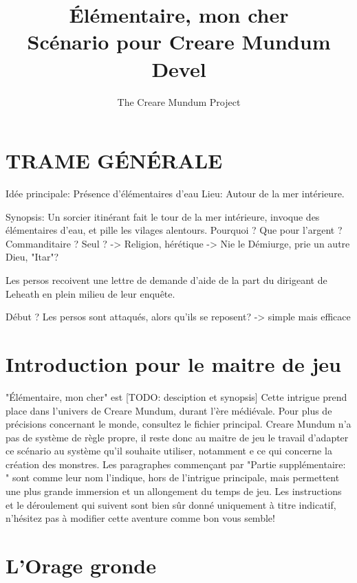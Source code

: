 \documentclass[a4paper]{article}
\title{Élémentaire, mon cher\\ Scénario pour Creare Mundum \\ Devel}
\author{The Creare Mundum Project}
\date{\oldstylenums{\insertdate}}
\begin{document}
\maketitle
\setcounter{tocdepth}{1} %
\renewcommand{\contentsname}{Sommaire} 
\tableofcontents
\newpage

\section*{TRAME GÉNÉRALE}
Idée principale: Présence d'élémentaires d'eau
Lieu: Autour de la mer intérieure.

Synopsis: Un sorcier itinérant fait le tour de la mer intérieure, invoque des élémentaires d'eau, et pille les vilages alentours.
Pourquoi ? Que pour l'argent ? Commanditaire ? Seul ?
-> Religion, hérétique -> Nie le Démiurge, prie un autre Dieu, "Itar"?

Les persos recoivent une lettre de demande d'aide de la part du dirigeant de Leheath en plein milieu de leur enquête.

Début ? Les persos sont attaqués, alors qu'ils se reposent? -> simple mais efficace


\section{Introduction pour le maitre de jeu}
"Élémentaire, mon cher" est [TODO: desciption et synopsis]
\newline
Cette intrigue prend place dans l'univers de Creare Mundum, durant l'ère médiévale. Pour plus de précisions concernant le monde, consultez le fichier principal.
\newline
Creare Mundum n'a pas de système de règle propre, il reste donc au maitre de jeu le travail d'adapter ce scénario au système qu'il souhaite utiliser, notamment e ce qui concerne la création des monstres.
\newline
Les paragraphes commençant par "Partie supplémentaire: " sont comme leur nom l'indique, hors de l'intrigue principale, mais permettent une plus grande immersion et un allongement du temps de jeu.
\newline
Les instructions et le déroulement qui suivent sont bien sûr donné uniquement à titre indicatif, n'hésitez pas à modifier cette aventure comme bon vous semble!

\section{L'Orage gronde}
\end{document}
